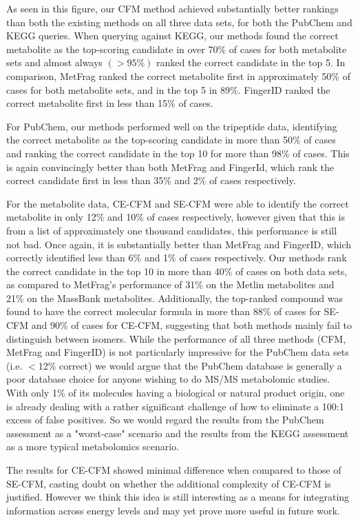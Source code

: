 As seen in this figure, our CFM method achieved substantially better rankings than both the existing methods on all three data sets, for both the PubChem and KEGG queries. When querying against KEGG, our methods found the correct metabolite as the top-scoring candidate in over 70\% of cases for both metabolite sets and almost always $(>95\%)$ ranked the correct candidate in the top 5. In comparison, MetFrag ranked the correct metabolite first in approximately 50\% of cases for both metabolite sets, and in the top 5 in 89\%. FingerID ranked the correct metabolite first in less than 15\% of cases.

For PubChem, our methods performed well on the tripeptide data, identifying the correct metabolite as the top-scoring candidate in more than 50\% of cases and ranking the correct candidate in the top 10 for more than 98\% of cases. This is again convincingly better than both MetFrag and FingerId, which rank the correct candidate first in less than 35\% and 2\% of cases respectively.

For the metabolite data, CE-CFM and SE-CFM were able to identify the correct metabolite in only 12\% and 10\% of cases respectively, however given that this is from a list of approximately one thousand candidates, this performance is still not bad. Once again, it is substantially better than MetFrag and FingerID, which correctly identified less than 6\% and 1\% of cases respectively. Our methods rank the correct candidate in the top 10 in more than 40\% of cases on both data sets, as compared to MetFrag's performance of 31\% on the Metlin metabolites and 21\% on the MassBank metabolites. Additionally, the top-ranked compound was found to have the correct molecular formula in more than 88\% of cases for SE-CFM and 90\% of cases for CE-CFM, suggesting that both methods mainly fail to distinguish between isomers.  While the performance of all three methods (CFM, MetFrag and FingerID) is not particularly impressive for the PubChem data sets (i.e. $<$12\% correct) we would argue that the PubChem database is generally a poor database choice for anyone wishing to do MS/MS metabolomic studies.  With only 1\% of its molecules having a biological or natural product origin, one is already dealing with a rather significant challenge of how to eliminate a 100:1 excess of false positives.  So we would regard the results from the PubChem assessment as a "worst-case" scenario and the results from the KEGG assessment as a more typical metabolomics scenario.

The results for CE-CFM showed minimal difference when compared to those of SE-CFM, casting doubt on whether the additional complexity of CE-CFM is justified. 
However we think this idea is still interesting as a means for integrating information across energy levels and may yet prove more useful in future work.  

